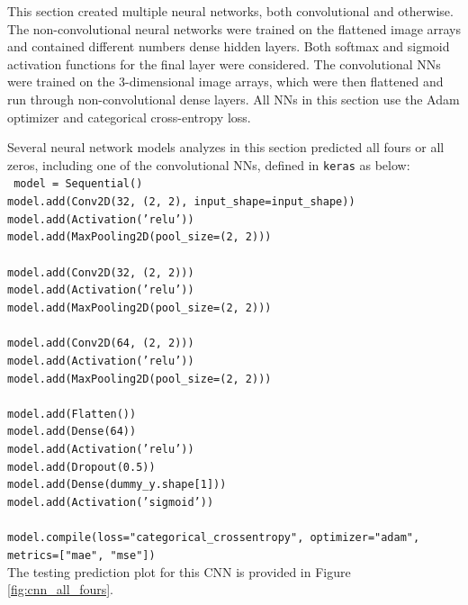 \documentclass[12pt, oneside]{article}   	%
\begin{document}
This section created multiple neural networks, both convolutional and otherwise. The non-convolutional neural networks were trained on the flattened image arrays and contained different numbers dense hidden layers. Both softmax and sigmoid activation functions for the final layer were considered. The convolutional NNs were trained on the 3-dimensional image arrays, which were then flattened and run through non-convolutional dense layers. All NNs in this section use the Adam optimizer and categorical cross-entropy loss.

Several neural network models analyzes in this section predicted all fours or all zeros, including one of the convolutional NNs, defined in \texttt{keras} as below: \\
\texttt{%
model = Sequential()  \\
model.add(Conv2D(32, (2, 2), input\_shape=input\_shape))  \\
model.add(Activation('relu'))  \\
model.add(MaxPooling2D(pool\_size=(2, 2)))  \\
\\
model.add(Conv2D(32, (2, 2)))  \\
model.add(Activation('relu'))  \\
model.add(MaxPooling2D(pool\_size=(2, 2)))  \\
\\
model.add(Conv2D(64, (2, 2)))  \\
model.add(Activation('relu'))  \\
model.add(MaxPooling2D(pool\_size=(2, 2)))  \\
\\
model.add(Flatten())  \\
model.add(Dense(64))  \\
model.add(Activation('relu'))  \\
model.add(Dropout(0.5))  \\
model.add(Dense(dummy\_y.shape[1]))  \\
model.add(Activation('sigmoid')) \\
	\\
model.compile(loss="categorical\_crossentropy", optimizer="adam", \\
metrics=["mae", "mse"]) \\
} The testing prediction plot for this CNN is provided in Figure \ref{fig:cnn_all_fours}.
\end{document}
